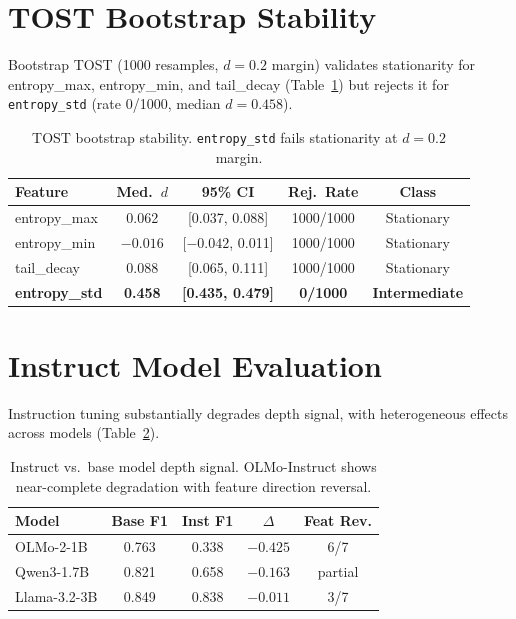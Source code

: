 \documentclass[11pt,a4paper]{article}
\begin{document}
\section{TOST Bootstrap Stability}
\label{sec:tost}

Bootstrap TOST (1000 resamples, $d = 0.2$ margin) validates stationarity for entropy\_max, entropy\_min, and tail\_decay (Table~\ref{tab:tost_app}) but rejects it for \texttt{entropy\_std} (rate 0/1000, median $d = 0.458$).

\begin{table}[h]
\centering
\small
\begin{tabular}{lcccc}
\toprule
\textbf{Feature} & \textbf{Med.\ $d$} & \textbf{95\% CI} & \textbf{Rej.\ Rate} & \textbf{Class} \\
\midrule
entropy\_max & 0.062 & [0.037, 0.088] & 1000/1000 & Stationary \\
entropy\_min & $-0.016$ & [$-0.042$, 0.011] & 1000/1000 & Stationary \\
tail\_decay & 0.088 & [0.065, 0.111] & 1000/1000 & Stationary \\
\textbf{entropy\_std} & \textbf{0.458} & \textbf{[0.435, 0.479]} & \textbf{0/1000} & \textbf{Intermediate} \\
\bottomrule
\end{tabular}
\caption{TOST bootstrap stability. \texttt{entropy\_std} fails stationarity at $d = 0.2$ margin.}
\label{tab:tost_app}
\end{table}

\section{Instruct Model Evaluation}
\label{app:instruct}

Instruction tuning substantially degrades depth signal, with heterogeneous effects across models (Table~\ref{tab:instruct_app}).

\begin{table}[h]
\centering
\small
\begin{tabular}{lcccc}
\toprule
\textbf{Model} & \textbf{Base F1} & \textbf{Inst F1} & \textbf{$\Delta$} & \textbf{Feat Rev.} \\
\midrule
OLMo-2-1B & 0.763 & 0.338 & $-0.425$ & 6/7 \\
Qwen3-1.7B & 0.821 & 0.658 & $-0.163$ & partial \\
Llama-3.2-3B & 0.849 & 0.838 & $-0.011$ & 3/7 \\
\bottomrule
\end{tabular}
\caption{Instruct vs.\ base model depth signal. OLMo-Instruct shows near-complete degradation with feature direction reversal.}
\label{tab:instruct_app}
\end{table}
\end{document}
